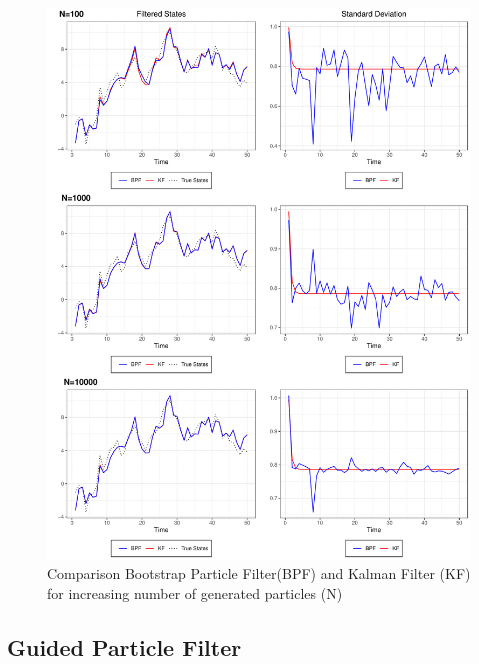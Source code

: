 \documentclass[
]{book}
\theoremstyle{break}
\theoremstyle{nonumberplain}
\begin{document}
\begin{figure}[H]

{\centering \includegraphics{final-draft_files/figure-latex/unnamed-chunk-17-1} 

}

\caption{Comparison Bootstrap Particle Filter(BPF) and Kalman Filter (KF) for increasing number of generated particles (N)}\label{fig:unnamed-chunk-17}
\end{figure}

\hfill\break

\subsection{Guided Particle Filter}
\end{document}
